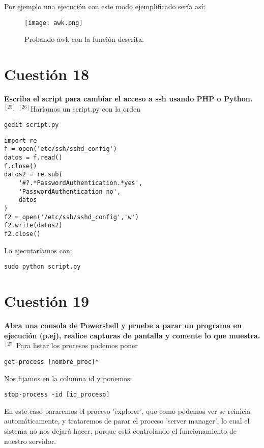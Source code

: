 \documentclass[a4paper, 11pt]{article} %
\begin{document}
Por ejemplo una ejecución con este modo ejemplificado sería así:
\begin{figure}[h]
\centering 
\texttt{[image: awk.png]} 
\caption{Probando awk con la función descrita.} 
\vspace{-0.5cm}
\label{contexto:figura} 
\end{figure}


\pagebreak

\section{Cuestión 18}
\textbf{Escriba el script para cambiar el acceso a ssh usando PHP o Python.}\\

$^{[25]}$ $^{[26]}$Haríamos un script.py con la orden
\begin{verbatim}
gedit script.py
\end{verbatim}

\begin{verbatim}
import re
f = open('etc/ssh/sshd_config')
datos = f.read()
f.close()
datos2 = re.sub(
    '#?.*PasswordAuthentication.*yes',
    'PasswordAuthentication no',
    datos
)
f2 = open('/etc/ssh/sshd_config','w')
f2.write(datos2)
f2.close()
\end{verbatim}

Lo ejecutaríamos con:
\begin{verbatim}
sudo python script.py
\end{verbatim}

\pagebreak

\section{Cuestión 19}
\textbf{Abra una consola de Powershell y pruebe a parar un programa en ejecución (p.ej), realice capturas de pantalla y comente lo que muestra.}\\

$^{[27]}$Para listar los procesos podemos poner 
\begin{verbatim}
get-process [nombre_proc]*
\end{verbatim}

Nos fijamos en la columna id y ponemos:

\begin{verbatim}
stop-process -id [id_proceso] 
\end{verbatim}

En este caso pararemos el proceso 'explorer', que como podemos ver se reinicia automáticamente, y trataremos de parar el proceso 'server manager', lo cual el sistema no nos dejará hacer, porque está controlando el funcionamiento de nuestro servidor.
\end{document}
